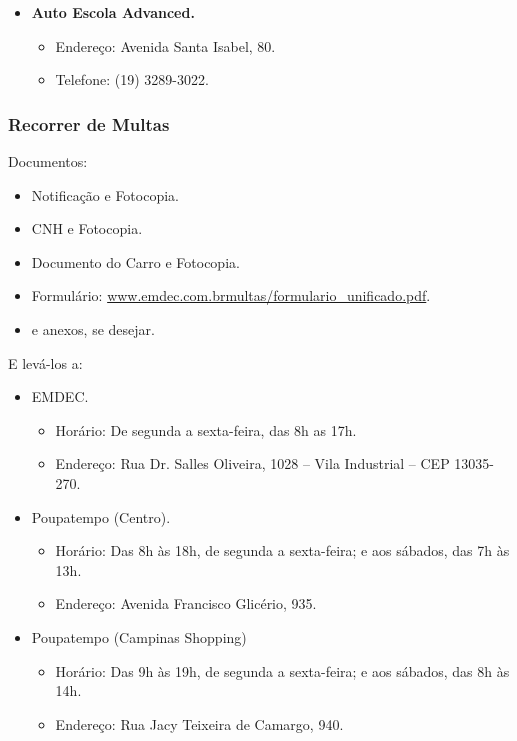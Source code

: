 \begin{itemize}
\item  \textbf{Auto Escola Advanced.}
\begin{itemize}
\item  Endereço: Avenida Santa Isabel, 80.
\item  Telefone: (19) 3289-3022.
\end{itemize}
\end{itemize}

\subsubsection{Recorrer de Multas}

Documentos:
\begin{itemize}
\item  Notificação e Fotocopia.
\item  CNH e Fotocopia.
\item  Documento do Carro e Fotocopia.
\item  Formulário: \url{www.emdec.com.brmultas/formulario_unificado.pdf}.
\item  e anexos, se desejar.
\end{itemize}

E levá-los a:
\begin{itemize}
\item  EMDEC.
\begin{itemize}
\item  Horário: De segunda a sexta-feira, das 8h as 17h.
\item  Endereço: Rua Dr. Salles Oliveira, 1028 -- Vila Industrial -- CEP 13035-270.
\end{itemize}
\item  Poupatempo (Centro).
\begin{itemize}
\item  Horário: Das 8h às 18h, de segunda a sexta-feira; e aos sábados, das 7h às 13h.
\item  Endereço: Avenida Francisco Glicério, 935.
\end{itemize}
\item  Poupatempo (Campinas Shopping)
\begin{itemize}
\item  Horário: Das 9h às 19h, de segunda a sexta-feira; e aos sábados, das 8h às 14h.
\item  Endereço: Rua Jacy Teixeira de Camargo, 940.
\end{itemize}
\end{itemize}


